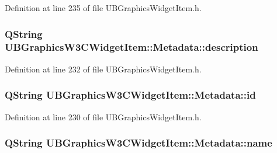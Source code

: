 Definition at line 235 of file U\-B\-Graphics\-Widget\-Item.\-h.

\hypertarget{class_u_b_graphics_w3_c_widget_item_1_1_metadata_abea90db5cdb67a44d7f97b531df2b498}{
\subsubsection[{description}]{\setlength{\rightskip}{0pt plus 5cm}Q\-String U\-B\-Graphics\-W3\-C\-Widget\-Item\-::\-Metadata\-::description}}\label{d2/dea/class_u_b_graphics_w3_c_widget_item_1_1_metadata_abea90db5cdb67a44d7f97b531df2b498}


Definition at line 232 of file U\-B\-Graphics\-Widget\-Item.\-h.

\hypertarget{class_u_b_graphics_w3_c_widget_item_1_1_metadata_aa71a03b257d8af4470bc35ddd16282c8}{
\subsubsection[{id}]{\setlength{\rightskip}{0pt plus 5cm}Q\-String U\-B\-Graphics\-W3\-C\-Widget\-Item\-::\-Metadata\-::id}}\label{d2/dea/class_u_b_graphics_w3_c_widget_item_1_1_metadata_aa71a03b257d8af4470bc35ddd16282c8}


Definition at line 230 of file U\-B\-Graphics\-Widget\-Item.\-h.

\hypertarget{class_u_b_graphics_w3_c_widget_item_1_1_metadata_a0f9a4896e60269923cfb5b7ae57fc7a1}{
\subsubsection[{name}]{\setlength{\rightskip}{0pt plus 5cm}Q\-String U\-B\-Graphics\-W3\-C\-Widget\-Item\-::\-Metadata\-::name}}\label{d2/dea/class_u_b_graphics_w3_c_widget_item_1_1_metadata_a0f9a4896e60269923cfb5b7ae57fc7a1}


